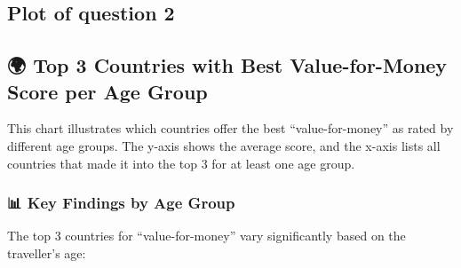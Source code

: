 \documentclass[
  letterpaper,
  DIV=11,
  numbers=noendperiod]{scrartcl}
\begin{document}
\subsection{Plot of question 2}\label{plot-of-question-2}

\subsection{🌍 Top 3 Countries with Best Value-for-Money Score per Age
Group}\label{top-3-countries-with-best-value-for-money-score-per-age-group}

This chart illustrates which countries offer the best
``value-for-money'' as rated by different age groups. The y-axis shows
the average score, and the x-axis lists all countries that made it into
the top 3 for at least one age group.

\subsubsection{📊 Key Findings by Age
Group}\label{key-findings-by-age-group}

The top 3 countries for ``value-for-money'' vary significantly based on
the traveller's age:
\end{document}
